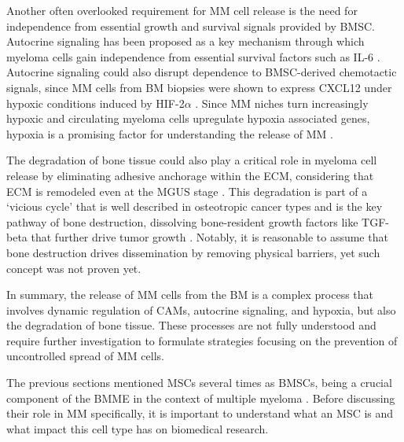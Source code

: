 Another often overlooked requirement for \ac{MM} cell release is the need for
independence from essential growth and survival signals provided by \ac{BMSC}.
Autocrine signaling has been proposed as a key mechanism through which myeloma
cells gain independence from essential survival factors such as IL-6
\cite{frassanitoAutocrineInterleukin6Production2001,
    urashimaCD40LigandTriggered1995}. Autocrine signaling could also disrupt
dependence to \ac{BMSC}-derived chemotactic signals, since \ac{MM} cells from
\ac{BM} biopsies were shown to express CXCL12 under hypoxic conditions induced
by HIF-2$\alpha$ \cite{martinHypoxiainducibleFactor2Novel2010}. Since \ac{MM}
niches turn increasingly hypoxic and circulating myeloma cells upregulate
hypoxia associated genes, hypoxia is a promising factor for understanding the
release of \ac{MM} \cite{garcesTranscriptionalProfilingCirculating2020}.



The degradation of bone tissue could also play a critical role in myeloma cell
release by eliminating adhesive anchorage within the ECM, considering that
\ac{ECM} is remodeled even at the \ac{MGUS} stage
\cite{glaveyProteomicCharacterizationHuman2017}. This degradation is part of a
‘vicious cycle' that is well described in osteotropic cancer types and is the
key pathway of bone destruction, dissolving bone-resident growth factors like
\ac{TGF-beta} that further drive tumor growth
\cite{haradaMyelomaBoneInteraction2021, siclariMolecularInteractionsBreast2007,
    wangProstateCancerPromotes2019}. Notably, it is reasonable to assume that bone
destruction drives dissemination by removing physical barriers, yet such concept
was not proven yet.


In summary, the release of \ac{MM} cells from the \ac{BM} is a complex process
that involves dynamic regulation of \acp{CAM}, autocrine signaling, and hypoxia,
but also the degradation of bone tissue. These processes are not fully
understood and require further investigation to formulate strategies focusing on
the prevention of uncontrolled spread of \ac{MM} cells.







%
\label{sec:intro_hMSCs}%
The previous sections mentioned \acp{MSC} several times as \acp{BMSC}, being a
crucial component of the \ac{BMME} in the context of multiple myeloma
\cite{mangoliniBoneMarrowStromal2020}. Before discussing their role in \ac{MM}
specifically, it is important to understand what an \ac{MSC} is and what impact
this cell type has on biomedical research.

